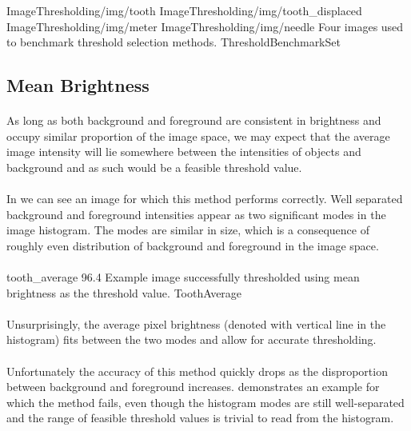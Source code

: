 \fourFigures
{ImageThresholding/img/tooth}
{ImageThresholding/img/tooth_displaced}
{ImageThresholding/img/meter}
{ImageThresholding/img/needle}
{Four images used to benchmark threshold selection methods.}
{ThresholdBenchmarkSet}
{\basicWidth}


\subsection{Mean Brightness}

\paragraph*{}
As long as both background and foreground are consistent in brightness and occupy similar proportion of the image space, we may expect that the average image intensity will lie somewhere between the intensities of objects and background and as such would be a feasible threshold value. 

\paragraph*{}
In  we can see an image for which this method performs correctly. Well separated background and foreground intensities appear as two significant modes in the image histogram. The modes are similar in size, which is a consequence of roughly even distribution of background and foreground in the image space. 

\paragraph*{}

\thresholdFigure
{tooth_average}
{96.4}
{Example image successfully thresholded using mean brightness as the threshold value.}
{ToothAverage}

\paragraph*{}
Unsurprisingly, the average pixel brightness (denoted with vertical line in the histogram) fits between the two modes and allow for accurate thresholding.

\paragraph*{}
Unfortunately the accuracy of this method quickly drops as the disproportion between background and foreground increases.  demonstrates an example for which the method fails, even though the histogram modes are still well-separated and the range of feasible threshold values is trivial to read from the histogram. 

